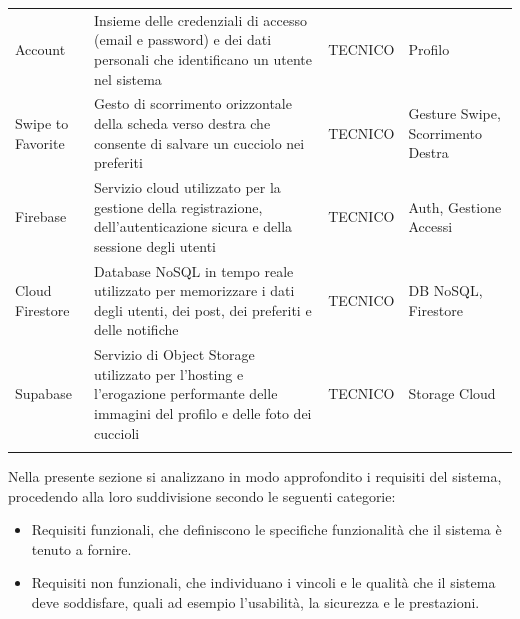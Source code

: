 \documentclass[a4paper]{report}
\begin{document}
\begin{longtable}{ >{\raggedright\arraybackslash}p{1.5cm} >{\raggedright\arraybackslash}p{5.5cm} >{\raggedright\arraybackslash}p{2cm} >{\raggedright\arraybackslash}p{2.97cm}}
Account & Insieme delle credenziali di accesso (email e password) e dei dati personali che identificano un utente nel sistema & TECNICO & Profilo \\ \addlinespace
Swipe to Favorite & Gesto di scorrimento orizzontale della scheda verso destra che consente di salvare un cucciolo nei preferiti & TECNICO & Gesture Swipe, Scorrimento Destra \\ \addlinespace
Firebase & Servizio cloud utilizzato per la gestione della registrazione, dell'autenticazione sicura e della sessione degli utenti & TECNICO & Auth, Gestione Accessi \\ \addlinespace
Cloud Firestore & Database NoSQL in tempo reale utilizzato per memorizzare i dati degli utenti, dei post, dei preferiti e delle notifiche & TECNICO & DB NoSQL, Firestore \\ \addlinespace
Supabase & Servizio di Object Storage utilizzato per l'hosting e l'erogazione performante delle immagini del profilo e delle foto dei cuccioli & TECNICO & Storage Cloud \\ \addlinespace
\end{longtable}

Nella presente sezione si analizzano in modo approfondito i requisiti del sistema, procedendo alla loro suddivisione secondo le seguenti categorie:
\begin{itemize}
   \item Requisiti funzionali, che definiscono le specifiche funzionalità che il sistema è tenuto a fornire.
   \item Requisiti non funzionali, che individuano i vincoli e le qualità che il sistema deve soddisfare, quali ad esempio l'usabilità, la sicurezza e le prestazioni.
\end{itemize}
\end{document}

